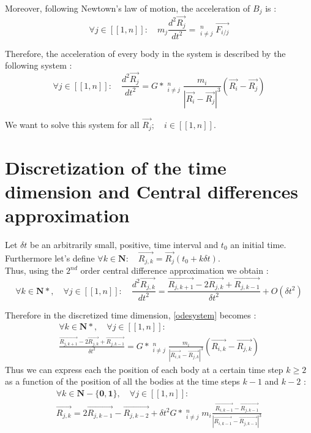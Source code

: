 \documentclass[a4paper,11pt]{article}
\begin{document}
Moreover, following Newtown's law of motion, the acceleration of $B_j$ is :
\begin{equation}
  \forall j \in [[1, n]]:\quad m_j \frac{d^2\vec{R_j}}{dt^2} =
  \mathop{\sum_{i=1}}_{i \ne j}^n \vec{F_{i/j}}
\end{equation}

Therefore, the acceleration of every body in the system is described by the following system :
\begin{equation}
  \forall j \in [[1, n]]:\quad \frac{d^2\vec{R_j}}{dt^2} =
  G*\mathop{\sum_{i=1}}_{i \ne j}^n \frac{m_i}{|{\vec{R_i} - \vec{R_j}}|^3} (\vec{R_i} - \vec{R_j})
  \label{odesystem}
\end{equation}

We want to solve this system for all $\vec{R_j}; \quad i \in [[1, n]]$.

\section{Discretization of the time dimension and Central differences approximation}
Let $\delta t$ be an arbitrarily small, positive, time interval and $t_0$ an initial time.
Furthermore let's define $\forall k \in \mathbf{N}:\quad \vec{R_{j,k}} = \vec{R_j}(t_0+k\delta t)$.\\
Thus, using the $2^{nd}$ order central difference approximation we obtain :
\begin{equation}
  \forall k \in \mathbf{N*},\quad \forall j \in [[1, n]]:\quad
  \frac{d^2\vec{R_{j,k}}}{dt^2} = \frac{\vec{R_{j,k+1}} - 2 \vec{R_{j,k}} + \vec{R_{j,k-1}}}{\delta t^2}+ O(\delta t^2)
\end{equation}

Therefore in the discretized time dimension, \eqref{odesystem} becomes :
\begin{multline}
  \forall k \in \mathbf{N*},\quad \forall j \in [[1, n]]:\\
  \frac{\vec{R_{j,k+1}} - 2 \vec{R_{j,k}} + \vec{R_{j,k-1}}}{\delta t^2} = 
  G*\mathop{\sum_{i=1}}_{i \ne j}^n \frac{m_i}{|{\vec{R_{i,k}} - \vec{R_{j,k}}}|^3}
  (\vec{R_{i,k}} - \vec{R_{j,k}})
\end{multline}
Thus we can express each the position of each body at a certain time step $k \ge 2$
as a function of the position of all the bodies at the time steps $k - 1$ and $k - 2$ :
\begin{multline}
  \forall k \in \mathbf{N-\{0,1\}},\quad \forall j \in [[1, n]]:\\
  \vec{R_{j,k}} = 2 \vec{R_{j,k-1}} - \vec{R_{j,k-2}} +
  \delta t^2 G* \mathop{\sum_{i=1}}_{i \ne j}^n m_i
  \frac{\vec{R_{i,k-1}} - \vec{R_{j,k-1}}}{|{\vec{R_{i,k-1}} - \vec{R_{j,k-1}}}|^3}
  \label{dodesystem}
\end{multline}
\end{document}
